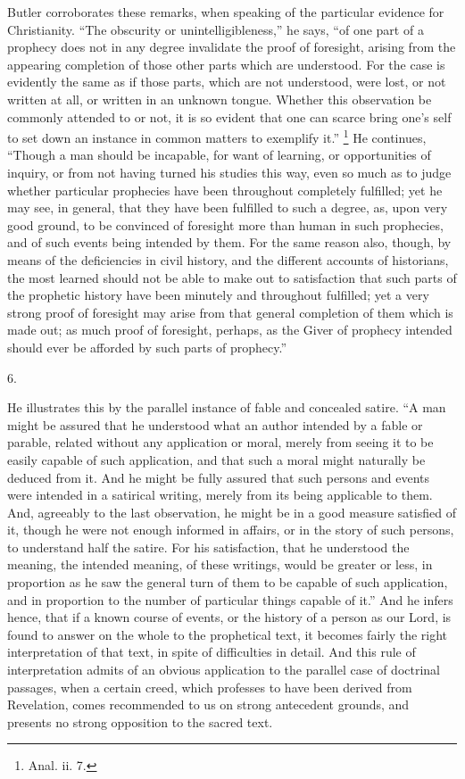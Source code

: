 Butler corroborates these remarks, when speaking of the particular evidence for Christianity. ``The
obscurity or unintelligibleness,'' he says, ``of
one part of a prophecy does not in any degree invalidate
the proof of foresight, arising from the appearing
completion of those other parts which are understood. For
the case is evidently the same as if those parts, which
are not understood, were lost, or not written at all, or
written in an unknown tongue. Whether this observation be
commonly attended to or not, it is so evident that one
can scarce bring one's self to set down an instance in
common matters to exemplify it.'' \footnote{Anal. ii. 7.} He continues, ``Though a
man should be incapable, for want of learning, or
opportunities of inquiry, or from not having turned his
studies this way, even so much as to judge whether
particular prophecies have been throughout completely
fulfilled; yet he may see, in general, that they have
been fulfilled to such a degree, as, upon very good
ground, to be convinced of foresight more than human in
such prophecies, and of such events being intended by
them. For the same reason also, though, by means of the
deficiencies in civil history, and the different accounts
of historians, the most learned should not be able to
make out to satisfaction that such parts of the prophetic
history have been minutely and throughout fulfilled; yet
a very strong proof of foresight may arise from that
general completion of them which is made out; as much
proof of foresight, perhaps, as the Giver of prophecy
intended should ever be afforded by such parts of
prophecy.''

6.

He illustrates this by the parallel instance of fable
and concealed satire. ``A man might be assured that
he understood what an author intended by a fable or
parable, related without any application or moral, merely
from seeing it to be easily capable of such application,
and that such a moral might naturally be deduced from it.
And he might be fully assured that such persons and
events were intended in a satirical writing, merely from
its being applicable to them. And, agreeably to the last
observation, he might be in a good measure satisfied of
it, though he were not enough informed in affairs, or in
the story of such persons, to understand half the satire.
For his satisfaction, that he understood the meaning, the
intended meaning, of these writings, would be greater or
less, in proportion as he saw the general turn of them to
be capable of such application, and in proportion to the
number of particular things capable of it.'' And he
infers hence, that if a known course of events, or the
history of a person as our Lord, is found to answer on
the whole to the prophetical text, it becomes fairly the
right interpretation of that text, in spite of
difficulties in detail. And this rule of interpretation
admits of an obvious application to the parallel case of
doctrinal passages, when a certain creed, which professes
to have been derived from Revelation, comes recommended
to us on strong antecedent grounds, and presents no
strong opposition to the sacred text.

